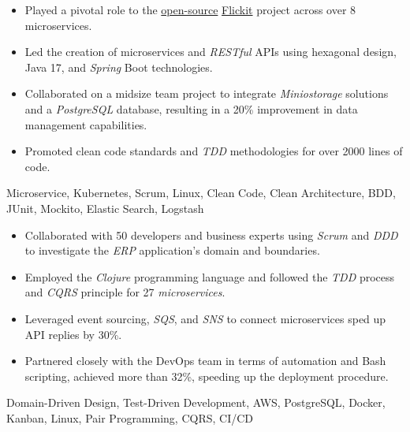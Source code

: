 \vspace*{-10pt}
\begin{experiences}
{

  \begin{itemize}
    \item Played a pivotal role to the \href{https://github.com/flickit-platform/flickit-assessment}{open-source} \href{https://flickit.org/}{Flickit} project across over 8 microservices.
    \item Led the creation of microservices and \emph{RESTful} APIs using hexagonal design, Java 17, and \emph{Spring} Boot technologies.
    \item Collaborated on a midsize team project to integrate \emph{Miniostorage} solutions and a \emph{PostgreSQL} database, resulting in a 20\% improvement in data management capabilities.
    \item Promoted clean code standards and \emph{TDD} methodologies for over 2000 lines of code. \end{itemize}}
  {Microservice, Kubernetes, Scrum, Linux, Clean Code, Clean Architecture, BDD, JUnit, Mockito, Elastic Search, Logstash} 
 \emptySeparator
 {
\begin{itemize}
   \item Collaborated with 50 developers and business experts using \emph{Scrum} and \emph{DDD} to investigate the \textit{ERP} application's domain and boundaries.
   \item Employed the \emph{Clojure} programming language and followed the \emph{TDD} process and \textit{CQRS} principle for 27 \emph{microservices}.
   \item Leveraged event sourcing, \emph{SQS}, and \emph{SNS} to connect microservices sped up API replies by 30\%.
   \item Partnered closely with the DevOps team in terms of automation and Bash scripting, achieved more than 32\%, speeding up the deployment procedure.
   \end{itemize}}{Domain-Driven Design, Test-Driven Development, AWS, PostgreSQL, Docker, Kanban, Linux, Pair Programming, CQRS, CI/CD}

\end{experiences}
